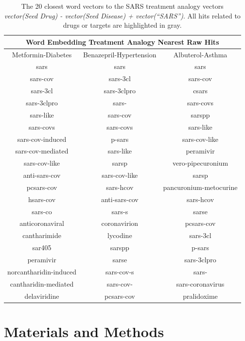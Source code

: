 \documentclass{article}
\newcommand{\lgc}[1]{\cellcolor[gray]{0.85}#1}
\begin{document}
\begin{table}[t!]
\footnotesize
\centering
\caption{The 20 closest word vectors to the SARS treatment analogy vectors  \emph{vector(Seed Drug) - vector(Seed Disease) + vector(``SARS'')}. All hits related to drugs or targets are highlighted in gray.}
\label{tab:analogy_top20}
\begin{tabular}{c c c}
\hline
\multicolumn{3}{c}{Word Embedding Treatment Analogy Nearest Raw Hits} \\
\hline
Metformin-Diabetes & Benazepril-Hypertension & Albuterol-Asthma \\
\hline
sars & sars & sars \\
sars-cov & \lgc{sars-3cl} & sars-cov \\
\lgc{sars-3cl} & \lgc{sars-3clpro} & csars \\
\lgc{sars-3clpro} & sars- & sars-covs \\
sars-like & sars-cov & sarspp \\
sars-covs & sars-covs & sars-like \\
sars-cov-induced & p-sars & sars-cov-like \\
sars-cov-mediated & sars-like & \lgc{peramivir} \\
sars-cov-like & sarsp & \lgc{vero-pipecuronium} \\
anti-sars-cov & sars-cov-like & sarsp \\
pcsars-cov & sars-hcov & \lgc{pancuronium-metocurine} \\
hsars-cov & anti-sars-cov & sars-hcov \\
sars-co & sars-s & sarse \\
anticoronaviral & coronavirion & pcsars-cov \\
\lgc{cantharimide} & lycodine & \lgc{sars-3cl} \\
sar405 & sarspp & p-sars \\
\lgc{peramivir} & sarse & \lgc{sars-3clpro} \\
norcantharidin-induced & sars-cov-s & sars- \\
cantharidin-mediated & sars-cov- & sars-coronavirus \\
\lgc{delaviridine} & pcsars-cov & \lgc{pralidoxime} \\
\hline
\end{tabular}
\end{table}

\section{Materials and Methods}
\end{document}
